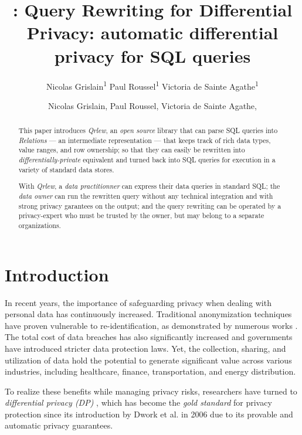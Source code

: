 \documentclass[letterpaper]{article} %
\title{\qrlew: Query Rewriting for Differential Privacy}
\author{
    Nicolas Grislain\textsuperscript{\rm 1}
    Paul Roussel\textsuperscript{\rm 1}
    Victoria de Sainte Agathe\textsuperscript{\rm 1}
}
\title{\qrlew: automatic differential privacy for SQL queries}
\author {
    Nicolas Grislain,
    Paul Roussel,
    Victoria de Sainte Agathe,
}
\newcommand{\qrlew}{\emph{Qrlew}}
\begin{document}
\maketitle

\begin{abstract}
This paper introduces \qrlew{}, an \emph{open source} library that can parse SQL queries into \emph{Relations} --- an intermediate representation --- that keeps track of rich data types, value ranges, and row ownership; so that they can easily be rewritten into \emph{differentially-private} equivalent and turned back into SQL queries for execution in a variety of standard data stores.

With \qrlew{}, a \emph{data practitionner} can express their data queries in standard SQL; the \emph{data owner} can run the rewritten query without any technical integration and with strong privacy garantees on the output; and the query rewriting can be operated by a privacy-expert who must be trusted by the owner, but may belong to a separate organizations.
\end{abstract}

\section{Introduction}

In recent years, the importance of safeguarding privacy when dealing with personal data has continuously increased.
Traditional anonymization techniques have proven vulnerable to re-identification, as demonstrated by numerous works \cite{archie2018s, dwork2017exposed, narayanan2008robust, sweeney2013identifying}.
The total cost of data breaches has also significantly increased \cite{ibm2023cost} and governments have introduced stricter data protection laws.
Yet, the collection, sharing, and utilization of data hold the potential to generate significant value across various industries, including healthcare, finance, transportation, and energy distribution.

To realize these benefits while managing privacy risks, researchers have turned to \emph{differential privacy (DP)} \cite{wood2018differential, dwork2014algorithmic}, which has become the \emph{gold standard} for privacy protection since its introduction by Dwork et al. in 2006 \cite{dwork2006calibrating} due to its provable and automatic privacy guarantees.
\end{document}
